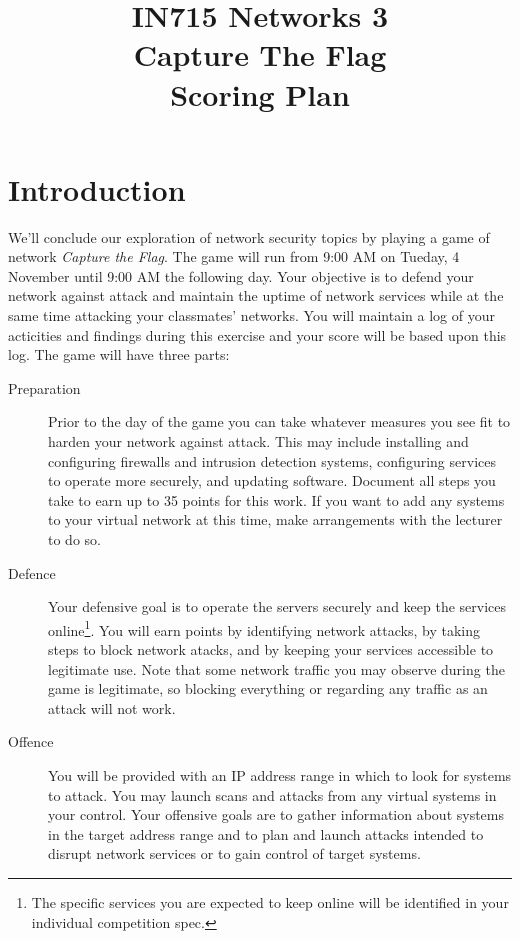 \documentclass{article}   	%
\title{IN715 Networks 3\\Capture The Flag\\Scoring Plan}
\date{}							%
\begin{document}
\maketitle

\section*{Introduction}
We'll conclude our exploration of network security topics by playing a game of network \emph{Capture the Flag}. The game will run from 9:00 AM on Tueday, 4 November until 9:00 AM the following day.  Your objective is to defend your network against attack and maintain the uptime of network services while at the same time attacking your classmates' networks.  You will maintain a log of your acticities and findings during this exercise and your score will be based upon this log. The game will have three parts:

\begin{description}
	\item [Preparation] Prior to the day of the game you can take whatever measures you see fit to harden your network against attack. This may include installing and configuring firewalls and intrusion detection systems, configuring services to operate more securely, and  updating software. Document all steps you take to earn up to 35 points for this work. If you want to add any systems to your virtual network at this time, make arrangements with the lecturer to do so.
  \item[Defence] Your defensive goal is to operate the servers securely and keep the services online\footnote{The specific services you are expected to keep online will be identified in your individual competition spec.}. You will earn points by identifying network attacks, by taking steps to block network atacks, and by keeping your services accessible to legitimate use.  Note that some network traffic you may observe during the game is legitimate, so blocking everything or regarding any traffic as an attack will not work.
  \item[Offence] You will be provided with an IP address range in which to look for systems to attack.  You may launch scans and attacks from any virtual systems in your control.  Your offensive goals are to gather information about systems in the target address range and to plan and launch attacks intended to disrupt network services or to gain control of target systems.  
\end{description}
\end{document}
